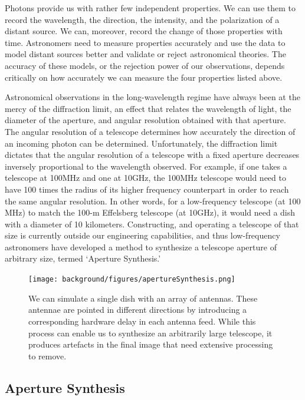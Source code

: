 Photons provide us with rather few independent properties. We can use them to record the wavelength, the direction, the intensity, and the polarization of a distant source. We can, moreover, record the change of those properties with time. Astronomers need to measure properties accurately and use the data to model distant sources better and validate or reject astronomical theories. The accuracy of these models, or the rejection power of our observations, depends critically on how accurately we can measure the four properties listed above. 

Astronomical observations in the long-wavelength regime have always been at the mercy of the diffraction limit, an effect that relates the wavelength of light, the diameter of the aperture, and angular resolution obtained with that aperture. The angular resolution of a telescope determines how accurately the direction of an incoming photon can be determined. Unfortunately, the diffraction limit dictates that the angular resolution of a telescope with a fixed aperture decreases inversely proportional to the wavelength observed. For example, if one takes a telescope at 100MHz and one at 10GHz, the 100MHz telescope would need to have 100 times the radius of its higher frequency counterpart in order to reach the same angular resolution. In other words, for a low-frequency telescope (at 100 MHz) to match the 100-m Effelsberg telescope (at 10GHz), it would need a dish with a diameter of 10 kilometers. Constructing, and operating a telescope of that size is currently outside our engineering capabilities, and thus low-frequency astronomers have developed a method to synthesize a telescope aperture of arbitrary size, termed `Aperture Synthesis.' 

\begin{figure}[h]
    \centering
    \texttt{[image: background/figures/apertureSynthesis.png]}
    \caption[Graphical representation of aperture synthesis]{We can simulate a single dish with an array of antennas. These antennae are pointed in different directions by introducing a corresponding hardware delay in each antenna feed. While this process can enable us to synthesize an arbitrarily large telescope, it produces artefacts in the final image that need extensive processing to remove. }
    \label{fig:aperture_synthesis}
\end{figure}


\subsection{Aperture Synthesis}

